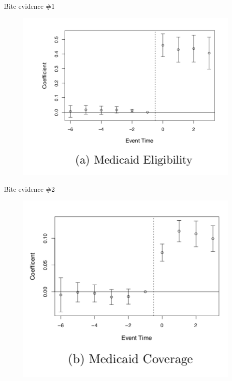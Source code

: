 \documentclass{beamer}
\begin{document}
\begin{frame}{Bite evidence \#1 }

	\begin{figure}
\includegraphics[scale=0.5]{./lecture_includes/Miller_Medicaid1.png}
	\end{figure}

\end{frame}

\begin{frame}{Bite evidence \#2 }

	\begin{figure}
\includegraphics[scale=0.5]{./lecture_includes/Miller_Medicaid2.png}
	\end{figure}

\end{frame}
\end{document}
